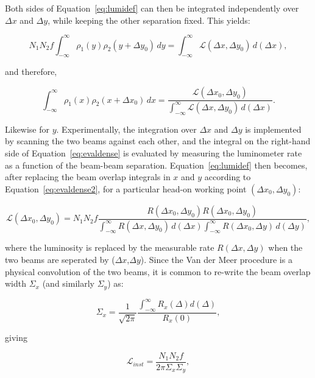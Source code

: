 Both sides of Equation~\ref{eq:lumidef} can then be integrated independently over $\Delta x$ and $\Delta y$, while keeping the other separation fixed. This yields:

\begin{equation}
\label{eq:evaldense}
N_1 N_2 f \int_{-\infty}^{\infty} \rho_1(y)\rho_2(y+\Delta y_0) \,dy = \int_{-\infty}^{\infty} \mathcal{L}(\Delta x, \Delta y_0) \,d(\Delta x),
\end{equation}

and therefore,

\begin{equation}
\label{eq:evaldense2}
\int_{-\infty}^{\infty} \rho_1(x)\rho_2(x+\Delta x_0) \,dx = \frac{\mathcal{L} (\Delta x_0, \Delta y_0)}{\int_{-\infty}^{\infty} \mathcal{L}(\Delta x, \Delta y_0) \,d(\Delta x)}.
\end{equation}


Likewise for $y$. Experimentally, the integration over $\Delta x$ and $\Delta y$ is implemented by scanning the two beams against each other, and the integral on the right-hand side of Equation~\ref{eq:evaldense} is evaluated by measuring the luminometer rate as a function of the beam-beam separation. Equation~\ref{eq:lumidef} then becomes, after replacing the beam overlap integrals in $x$ and $y$ according to Equation~\ref{eq:evaldense2}, for a particular head-on working point $(\Delta x_0, \Delta y_0)$:

\begin{equation}
\label{eq:lumidefVdM}
\mathcal{L} (\Delta x_0, \Delta y_0) = N_1 N_2 f  \frac{R (\Delta x_0, \Delta y_0) R (\Delta x_0, \Delta y_0)}{\int_{-\infty}^{\infty} R (\Delta x, \Delta y_0) \,d(\Delta x) \int_{-\infty}^{\infty} R(\Delta x_0, \Delta y) \,d(\Delta y)},
\end{equation}

where the luminosity is replaced by the measurable rate $R(\Delta x, \Delta y)$ when  the two beams are seperated by ($\Delta x$,$\Delta y$). Since the Van der Meer procedure is a physical convolution of the two beams, it is common to re-write the beam overlap width $\Sigma_x$ (and similarly $\Sigma_y$) as:


\begin{equation}
\label{eq:capsigma}
\Sigma_x = \frac{1}{\sqrt{2\pi}}\frac{\int_{-\infty}^{\infty} R_x{} (\Delta) d(\Delta)}{R_{x}(0)},
\end{equation}

giving

\begin{equation}
\label{eq:lumidefVdMcSig}
\mathcal{L}_{inst} =\frac{N_1 N_2 f}{2\pi\Sigma_x \Sigma_y},
\end{equation}

